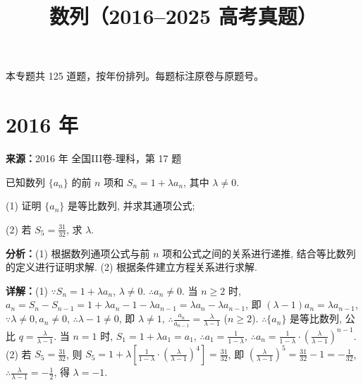 ﻿\title{数列（2016--2025 高考真题）}
\author{}
\date{}
\maketitle
\noindent 本专题共 125 道题，按年份排列。每题标注原卷与原题号。

\section*{2016 年}

\begin{question}[points=12]
\textbf{来源：}2016 年 全国III卷-理科，第 17 题\par
已知数列 $\{a_n\}$ 的前 $n$ 项和 $S_n=1+\lambda a_n$, 其中 $\lambda\ne 0$.

(1) 证明 $\{a_n\}$ 是等比数列, 并求其通项公式;

(2) 若 $S_5=\frac{31}{32}$, 求 $\lambda$.
\begin{solution}

\textbf{分析：}(1) 根据数列通项公式与前 $n$ 项和公式之间的关系进行递推, 结合等比数列的定义进行证明求解. (2) 根据条件建立方程关系进行求解.

\textbf{详解：}(1) $\because S_n=1+\lambda a_n$, $\lambda\ne0$. $\therefore a_n\ne0$. 当 $n\ge2$ 时, $a_n=S_n-S_{n-1}=1+\lambda a_n-1-\lambda a_{n-1}=\lambda a_n-\lambda a_{n-1}$, 即 $(\lambda-1)a_n=\lambda a_{n-1}$, $\because\lambda\ne0,a_n\ne0$, $\therefore\lambda-1\ne0$, 即 $\lambda\ne1$, $\therefore\frac{a_n}{a_{n-1}}=\frac{\lambda}{\lambda-1}$ ($n\ge2$). $\therefore\{a_n\}$ 是等比数列, 公比 $q=\frac{\lambda}{\lambda-1}$. 当 $n=1$ 时, $S_1=1+\lambda a_1=a_1$, $\therefore a_1=\frac{1}{1-\lambda}$, $\therefore a_n=\frac{1}{1-\lambda}\cdot(\frac{\lambda}{\lambda-1})^{n-1}$.
(2) 若 $S_5=\frac{31}{32}$, 则 $S_5=1+\lambda[\frac{1}{1-\lambda}\cdot(\frac{\lambda}{\lambda-1})^4]=\frac{31}{32}$, 即 $(\frac{\lambda}{\lambda-1})^5=\frac{31}{32}-1=-\frac{1}{32}$, $\therefore\frac{\lambda}{\lambda-1}=-\frac{1}{2}$, 得 $\lambda=-1$.
\end{solution}
\end{question}

